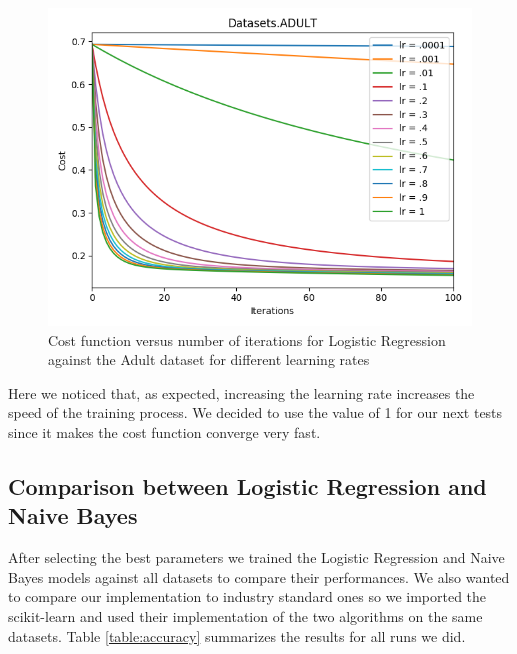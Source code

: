 \documentclass[conference]{IEEEtran}
\begin{document}
\begin{figure}
\label{fig:learning_rate}
\centering
\includegraphics[scale = 0.39]{figs/cost_vs_iterations/ADULT.png}
\caption[Cost function versus number of iterations for Logistic Regression against the Adult dataset for different learning rates]{Cost function versus number of iterations for Logistic Regression against the Adult dataset for different learning rates}
\end{figure}

Here we noticed that, as expected, increasing the learning rate increases the speed of the training process. We decided to use the value of 1 for our next tests since it makes the cost function converge very fast.


\subsection{Comparison between Logistic Regression and Naive Bayes}

After selecting the best parameters we trained the Logistic Regression and Naive Bayes models against all datasets to compare their performances. We also wanted to compare our implementation to industry standard ones so we imported the scikit-learn and used their implementation of the two algorithms on the same datasets. Table \ref{table:accuracy} summarizes the results for all runs we did.
\end{document}
